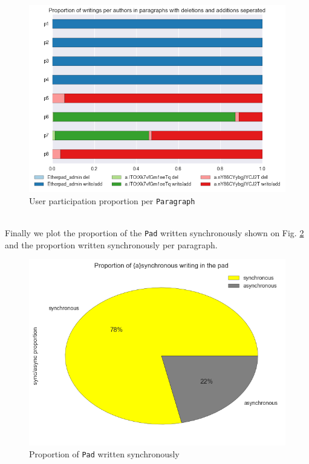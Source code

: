 \documentclass[a4, twocolumn, 12pt]{article}
\begin{document}
\begin{figure}[h]
\centering
\includegraphics[scale=0.4]{figures/user_participation_para.png}
\caption{User participation proportion per \texttt{Paragraph}}
\label{user_participation_para}
\end{figure}
\\
Finally we plot the proportion of the \texttt{Pad} written synchronously shown on Fig. \ref{sync_prop_pad} and the proportion written synchronously per paragraph.
\begin{figure}[h]
\centering
\includegraphics[scale=0.4]{figures/sync_prop_pad.png}
\caption{Proportion of \texttt{Pad} written synchronously}
\label{sync_prop_pad}
\end{figure}
\\
\end{document}
